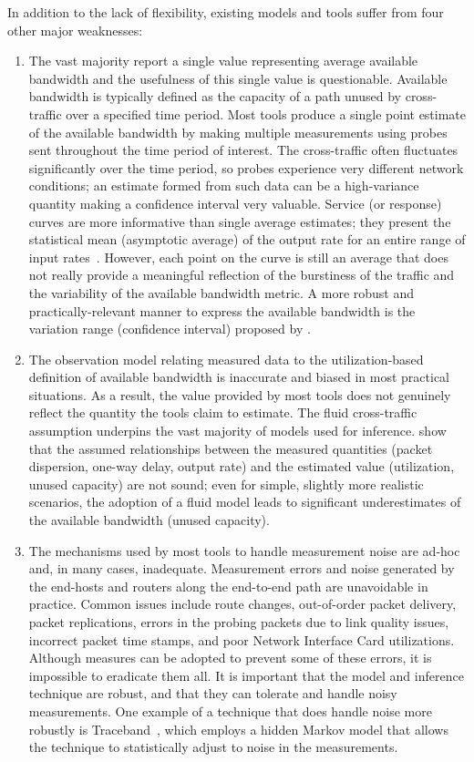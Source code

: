 \documentclass[final,5p,times,twocolumn]{elsarticle}
\begin{document}
In addition to the lack of flexibility, existing models and tools suffer from four other major weaknesses:
\begin{enumerate}
	\item The vast majority report a single value representing average available bandwidth and the usefulness of this single value is questionable. Available bandwidth is typically defined as the capacity of a path unused by cross-traffic over a specified time period. 
Most tools produce a single point estimate of the available bandwidth by making multiple measurements using probes sent throughout the time period of interest.  The cross-traffic often fluctuates significantly over the time period, so probes experience very different network conditions; an estimate formed from such data can be a high-variance quantity making a confidence interval very valuable.
	Service (or response) curves are more informative than single average estimates; they present the statistical mean (asymptotic average) of the output rate for an entire range of input rates~\cite{liu:08}. However, each point on the curve is still an average that does not really provide a meaningful reflection of the burstiness of the traffic and the variability of the available bandwidth metric. A more robust and practically-relevant manner to express the available bandwidth is the variation range (confidence interval) proposed by \citet{jai:03}.  
	\item The observation model relating measured data to the utilization-based definition of available bandwidth is inaccurate and biased in most practical situations. As a result, the value provided by most tools does not genuinely reflect the quantity the tools claim to estimate.  The fluid cross-traffic assumption underpins the vast majority of models used for inference. \citet{liu:08} show that the assumed relationships between the measured quantities (packet dispersion, one-way delay, output rate) and the estimated value (utilization, unused capacity) are not sound; even for simple, slightly more realistic scenarios, the adoption of a fluid model leads to significant underestimates of the available bandwidth (unused capacity).
	\item The mechanisms used by most tools to handle measurement noise are ad-hoc and, in many cases, inadequate.
Measurement errors and noise generated by the end-hosts and routers along the end-to-end path are unavoidable in practice. Common issues include route changes, out-of-order packet delivery, packet replications, errors in the probing packets due to link quality issues, incorrect packet time stamps, and poor Network Interface Card utilizations. Although measures can be adopted to prevent some of these errors, it is impossible to eradicate them all. It is important that the model and inference technique are robust, and that they can tolerate and handle noisy measurements. One example of a technique that does handle noise more robustly is Traceband~\cite{gue:09traceband}, which employs a hidden Markov model that allows the technique to statistically adjust to noise in the measurements.

\end{enumerate}
\end{document}
